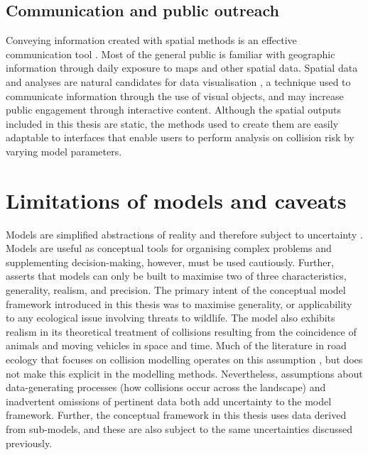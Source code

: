 \subsection{Communication and public outreach}

Conveying information created with spatial methods is an effective communication tool \citep{king00}. Most of the general public is familiar with geographic information through daily exposure to maps and other spatial data. Spatial data and analyses are natural candidates for data visualisation \citep{osul14}, a technique used to communicate information through the use of visual objects, and may increase public engagement through interactive content. Although the spatial outputs included in this thesis are static, the methods used to create them are easily adaptable to interfaces that enable users to perform analysis on collision risk by varying model parameters.

\section{Limitations of models and caveats}

Models are simplified abstractions of reality and therefore subject to uncertainty \citep{burg05}. Models are useful as conceptual tools for organising complex problems and supplementing decision-making, however, must be used cautiously. Further, \cite{levi66} asserts that models can only be built to maximise two of three characteristics, generality, realism, and precision. The primary intent of the conceptual model framework introduced in this thesis was to maximise generality, or applicability to any ecological issue involving threats to wildlife. The model also exhibits realism in its theoretical treatment of collisions resulting from the coincidence of animals and moving vehicles in space and time. Much of the literature in road ecology that focuses on collision modelling operates on this assumption \citep{form03,guns11}, but does not make this explicit in the modelling methods. Nevertheless, assumptions about data-generating processes (how collisions occur across the landscape) and inadvertent omissions of pertinent data both add uncertainty to the model framework. Further, the conceptual framework in this thesis uses data derived from sub-models, and these are also subject to the same uncertainties discussed previously.  


